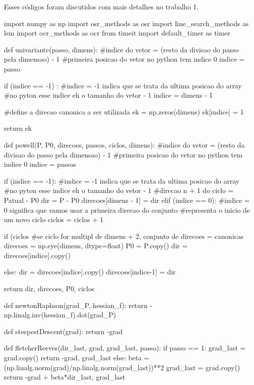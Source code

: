 \documentclass[10pt, a4paper]{article}
\begin{document}
Esses códigos foram discutidos com mais detalhes no trabalho 1.

\begin{python}
  import numpy as np
  import osr_methods as osr
  import line_search_methods as lsm
  import ocr_methods as ocr
  from timeit import default_timer as timer

  def univariante(passo, dimens):
      #indice do vetor = (resto da divisao do passo pela dimensao) - 1
      #primeira posicao do vetor no python tem indice 0
      indice = passo%
      
      if (indice == -1) :
          #indice = -1 indica que se trata da ultima posicao do array
          #no pyton esse indice eh o tamanho do vetor - 1
          indice = dimens - 1
          
      #define a direcao canonica a ser utilizada
      ek = np.zeros(dimens)
      ek[indice] = 1
      
      return ek
      
  def powell(P, P0, direcoes, passos, ciclos, dimens):
      #indice do vetor = (resto da divisao do passo pela dimensao) - 1
      #primeira posicao do vetor no python tem indice 0
      indice = passos%
      
      if (indice == -1):
          #indice = -1 indica que se trata da ultima posicao do array
          #no pyton esse indice eh o tamanho do vetor - 1
          #direcao n + 1 do ciclo = Patual - P0
          dir = P - P0
          direcoes[dimens - 1] = dir        
      elif (indice == 0):
          #indice = 0 significa que vamos usar a primeira direcao do conjunto
          #representa o inicio de um novo ciclo
          ciclos = ciclos + 1

          if (ciclos%
              #se ciclo for multipl de dimens + 2, conjunto de direcoes = canonicas
              direcoes = np.eye(dimens, dtype=float)
          P0 = P.copy()
          dir = direcoes[indice].copy()
          
      else:
          dir = direcoes[indice].copy()
          direcoes[indice-1] = dir
    
      return dir, direcoes, P0, ciclos            

  def newtonRaphson(grad_P, hessian_f):
      return -np.linalg.inv(hessian_f).dot(grad_P)

  def steepestDescent(grad):
      return -grad

  def fletcherReeves(dir_last, grad, grad_last, passo):
      if passo == 1:
          grad_last = grad.copy()
          return -grad, grad_last
      else:
          beta = (np.linalg.norm(grad)/np.linalg.norm(grad_last))**2
          grad_last = grad.copy()
          return -grad + beta*dir_last, grad_last
      

\end{python}
\end{document}

